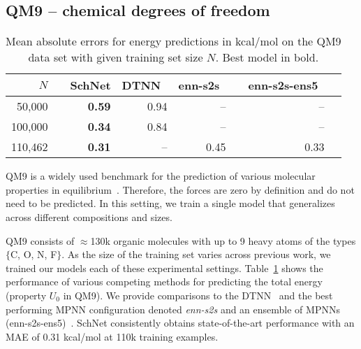 \documentclass{article}
\begin{document}
\subsection{QM9 -- chemical degrees of freedom}
\begin{table}
\caption{Mean absolute errors for energy predictions in kcal/mol on the QM9 data set with given training set size $N$. Best model in bold.}\label{tab:qm9}
\centering
\small
\begin{tabular}{rrrrrrrr}
\toprule
$N$ & & SchNet & DTNN~\citep{schutt2017quantum} & enn-s2s~\citep{gilmer2017neural} & & enn-s2s-ens5~\citep{gilmer2017neural}\\ \midrule
50,000  && \textbf{0.59} & 0.94 & --   & &  -- \\
100,000 && \textbf{0.34} & 0.84 & --   & &  -- \\
110,462 && \textbf{0.31} & --   & 0.45 & &  0.33 \\
\bottomrule
\end{tabular}
\end{table}
QM9 is a widely used benchmark for the prediction of various molecular properties in equilibrium~\citep{ramakrishnan2014quantum,blum2009gdb13,reymond2015chemical}.
Therefore, the forces are zero by definition and do not need to be predicted.
In this setting, we train a single model that generalizes across different compositions and sizes.

QM9 consists of $\approx$130k organic molecules with up to 9 heavy atoms of the types $\{$C, O, N, F$\}$. 
As the size of the training set varies across previous work, we trained our models each of these experimental settings.
Table~\ref{tab:qm9} shows the performance of various competing methods for predicting the total energy (property $U_0$ in QM9).
We provide comparisons to the DTNN~\citep{schutt2017quantum} and the best performing MPNN configuration denoted \emph{enn-s2s} and an ensemble of MPNNs (enn-s2s-ens5)~\citep{gilmer2017neural}.
SchNet consistently obtains state-of-the-art performance with an MAE of 0.31 kcal/mol at 110k training examples.
\end{document}
